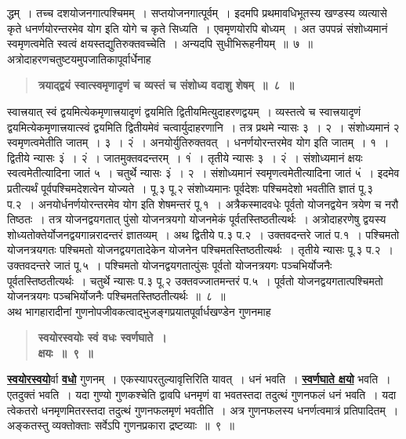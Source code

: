 \documentclass[11pt, openany]{book}
\begin{document}
\newpage

\begin{sloppypar}
\noindent द्धम्~। तच्च दशयोजनगात्पश्चिमम्~। सप्तयोजनगात्पूर्वम्~। इदमपि प्रथमावधिभूतस्य खण्डस्य व्यत्यासे कृते धनर्णयोरन्तरमेव योग इति योगे च कृते सिध्यति~। एवमृणयोरपि बोध्यम्~। अत उपपन्नं संशोध्यमानं स्वमृणत्वमेति स्वत्वं क्षयस्तद्युतिरुक्तवच्चेति~। अन्यदपि सुधीभिरूहनीयम्~॥~७~॥\\

{\small अत्रोदाहरणचतुष्टयमुपजातिकापूर्वार्धेनाह\textendash }

 \label{1.8}
\begin{quote}
{\large \textbf{{\color{purple}त्रयाद्द्वयं स्वात्स्वमृणादृणं च व्यस्तं च संशोध्य वदाशु शेषम्~॥~८~॥}}}
\end{quote}

स्वात्त्रयात् स्वं द्वयमित्येकमृणात्त्रयादृणं द्वयमिति द्वितीयमित्युदाहरणद्वयम्~। व्यस्तत्वे च स्वात्त्रयादृणं द्वयमित्येकमृणात्त्रयात्स्वं द्वयमिति द्वितीयमेवं चत्वार्युदाहरणानि~। तत्र प्रथमे न्यासः ३~। २~। संशोध्यमानं २ स्वमृणत्वमेतीति जातम्~। ३~। २ं~। अनयोर्युतिरुक्तवत्~। धनर्णयोरन्तरमेव योग इति जातम्~। १~। द्वितीये न्यासः ३ं~। २ं~। जातमुक्तवदन्तरम्~। १ं~। तृतीये न्यासः ३~। २ं~। संशोध्यमानं क्षयः स्वत्वमेतीत्यादिना जातं ५~। चतुर्थे न्यासः ३ं~। २~। संशोध्यमानं स्वमृणत्वमेतीत्यादिना जातं ५ं~। इदमेव प्रतीत्यर्थं पूर्वपश्चिमदेशत्वेन योज्यते~। पू.\;३ पू.\;२ संशोध्यमानः पूर्वदेशः पश्चिमदेशो भवतीति ज्ञातं पू.\;३ प.\;२~। अनयोर्धनर्णयोरन्तरमेव योग इति शेषमन्तरं पू.\;१~। अत्रैकस्मादवधेः पूर्वतो योजनद्वयेन त्रयेण च नरौ तिष्ठतः~। तत्र योजनद्वयगतात् पुंसो योजनत्रयगो योजनमेकं पूर्वतस्तिष्ठतीत्यर्थः~। अत्रोदाहरणेषु द्वयस्य शोध्यतोक्तेर्योजनद्वयगान्नरादन्तरं ज्ञातव्यम्~। अथ द्वितीये प.\;३ प.\;२~। उक्तवदन्तरे जातं प.\;१~। पश्चिमतो योजनत्रयगतः पश्चिमतो योजनद्वयगतादेकेन योजनेन पश्चिमतस्तिष्ठतीत्यर्थः~। तृतीये न्यासः पू.\;३ प.\;२~। उक्तवदन्तरे जातं पू.\;५~। पश्चिमतो योजनद्वयगतात्पुंसः पूर्वतो योजनत्रयगः पञ्चभिर्योजनैः पूर्वतस्तिष्ठतीत्यर्थः~। चतुर्थे न्यासः प.\;३ पू.\;२ उक्तवज्जातमन्तरं प.\;५~। पूर्वतो योजनद्वयगतात्पश्चिमतो योजनत्रयगः पञ्चभिर्योजनैः पश्चिमतस्तिष्ठतीत्यर्थः~॥~८~॥\\

{\small अथ भागहारादीनां गुणनोपजीवकत्वाद्भुजङ्गप्रयातपूर्वार्धखण्डेन गुणनमाह\textendash }

 \label{1.9}
\begin{quote}
{\large \textbf{{\color{purple}स्वयोरस्वयोः स्वं वधः स्वर्णघाते~। \\
क्षयः~॥~९~॥}}}
\end{quote}

\hyperref[1.9]{\textbf{स्वयोरस्वयो}}र्वा \hyperref[1.9]{\textbf{वधो}} गुणनम्~। एकस्यापरतुल्यावृत्तिरिति यावत्~। धनं भवति~। \hyperref[1.9]{\textbf{स्वर्णघाते क्षयो}} भवति~। एतदुक्तं भवति~। यदा गुण्यो गुणकश्चेति द्वावपि धनमृणं वा भवतस्तदा तदुत्थं गुणनफलं धनं भवति~। यदा त्वेकतरो धनमृणमितरस्तदा तदुत्थं गुणनफलमृणं भवतीति~। अत्र गुणनफलस्य धनर्णत्वमात्रं प्रतिपादितम्~। अङ्कतस्तु व्यक्तोक्ताः सर्वेऽपि गुणनप्रकारा द्रष्टव्याः~॥~९~॥
\end{sloppypar}
\end{document}
